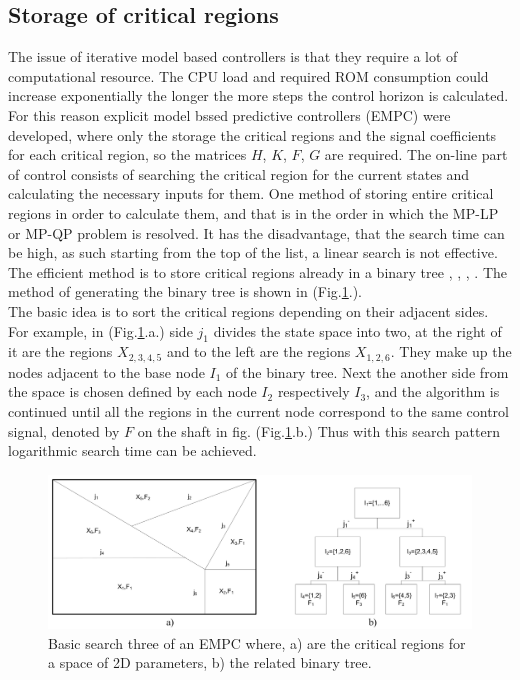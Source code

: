 \subsection{Storage of critical regions}\label{BASICCSR:sec:EMPCStorage}

The issue of iterative model based controllers is that they require a lot of computational resource. The CPU load and required ROM consumption could increase exponentially the longer the more steps the control horizon is calculated. For this reason explicit model bssed predictive controllers (EMPC) were developed, where only the storage the critical regions and the signal coefficients for each critical region, so the matrices $H$, $K$, $F$, $G$ are required. The on-line part of control consists of searching the critical region for the current states and calculating the necessary inputs for them.
One method of storing entire critical regions in order to calculate them, and that is in the order in which the MP-LP or MP-QP problem is resolved. It has the disadvantage, that the search time can be high, as such starting from the top of the list, a linear search is not effective. The efficient method is to store critical regions already in a binary tree \cite{jones2006logarithmic}, \cite{tondel2003evaluation}, \cite{tondel2003constrained}, \cite{kutasi2008vector}. The method of generating the binary tree is shown in (Fig.\ref{BASICMPC:fig:searchtree}.).\\
 The basic idea is to sort the critical regions depending on their adjacent sides. For example, in (Fig.\ref{BASICMPC:fig:searchtree}.a.) side $j_1$ divides the state space into two, at the right of it are the regions $X_{2,3,4,5}$ and to the left are the regions $X_{1,2,6}$. They make up the nodes adjacent to the base node $I_1$ of the binary tree. Next the another side from the space is chosen defined by each node $I_2$ respectively $I_3$, and the algorithm is continued until all the regions in the current node correspond to the same control signal, denoted by $F$ on the shaft in fig. (Fig.\ref{BASICMPC:fig:searchtree}.b.) Thus with this search pattern logarithmic search time can be achieved.

 \begin{figure}[!ht]
        \centering
        \includegraphics[width=\textwidth]{EMPC_PNG_Pics/BasicSearchTree.png}
        \caption{Basic search three of an EMPC where, a) are the critical regions for a space of 2D parameters,
b) the related binary tree.}
        \label{BASICMPC:fig:searchtree}
    \end{figure}

